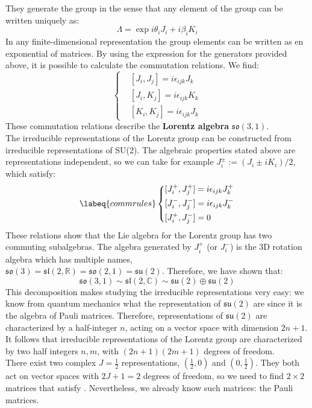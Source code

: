 \documentclass[../main.tex]{subfiles}
\begin{document}
They generate the group in the sense that any element of the group can be written uniquely as:
\[
\Lambda=\exp{i\theta_iJ_i+i\beta_iK_i}
\]
In any finite-dimensional representation the group elements can be written as en exponential of matrices.
By using the expression for the generators provided above, it is possible to calculate the commutation relations. We find:
\[
\left\{
\begin{aligned}
&[J_i,J_j]=i\epsilon_{ijk}J_k\\
&[J_i,K_j]=i\epsilon_{ijk}K_k\\
&[K_i,K_j]=i\epsilon_{ijk}J_k
\end{aligned}
\right.
\]
These commutation relations describe the \textbf{Lorentz algebra} $\mathfrak{so}(3,1)$.\\
The irreducible representations of the Lorentz group can be constructed from irreducible representations of SU(2). The algebraic properties stated above are representations independent, so we can take for example $J_i^\pm:=(J_i\pm iK_i)/2$, which satisfy:
\begin{equation}
\labeq{commrules}
\left\{
\begin{aligned}
&[J_i^+,J_j^+]=i\epsilon_{ijk}J^+_k\\
&[J_i^-,J_j^-]=i\epsilon_{ijk}J_k^-\\
&[J_i^+,J_j^-]=0
\end{aligned}
\right.
\end{equation}
These relations show that the Lie algebra for the Lorentz group has two commuting subalgebras. The algebra generated by $J_i^+$ (or $J_i^-$) is the 3D rotation algebra which has multiple names,\\
$\mathfrak{so}(3)=\mathfrak{sl}(2,\mathbb{R})=\mathfrak{so}(2,1)=\mathfrak{su}(2)$. Therefore, we have shown that:
\[
\mathfrak{so}(3,1)\sim\mathfrak{sl}(2,\mathbb{C})\sim\mathfrak{su}(2)\oplus\mathfrak{su}(2)
\]
This decomposition makes studying the irreducible representations very easy: we know from quantum mechanics what the representation of $\mathfrak{su}(2)$ are since it is the algebra of Pauli matrices. Therefore, representations of $\mathfrak{su}(2)$ are characterized by a half-integer $n$, acting on a vector space with dimension $2n+1$. It follows that irreducible representations of the Lorentz group are characterized by two half integers $n,m$, with $(2n+1)(2m+1)$ degrees of freedom.\\
There exist two complex $J=\frac{1}{2}$ representations, $\left(\frac{1}{2},0\right)$ and $\left(0,\frac{1}{2}\right)$. They both act on vector spaces with $2J+1=2$ degrees of freedom, so we need to find $2\times2$ matrices that satisfy . Nevertheless, we already know such matrices: the Pauli matrices.
\end{document}
